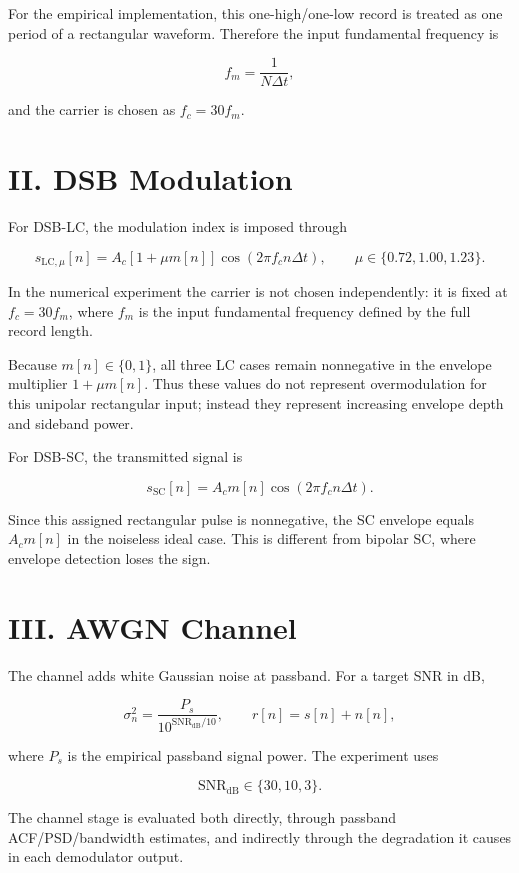 \documentclass[11pt]{article}
\begin{document}
For the empirical implementation, this one-high/one-low record is treated as one period of a rectangular waveform. Therefore the input fundamental frequency is

\[
f_m=\frac{1}{N\Delta t},
\]

and the carrier is chosen as $f_c=30f_m$.

\section{II. DSB Modulation}

For DSB-LC, the modulation index is imposed through

\[
s_{\mathrm{LC},\mu}[n]=A_c\left[1+\mu m[n]\right]\cos(2\pi f_c n\Delta t),
\qquad
\mu\in\{0.72,1.00,1.23\}.
\]

In the numerical experiment the carrier is not chosen independently: it is fixed at $f_c=30f_m$, where $f_m$ is the input fundamental frequency defined by the full record length.

Because $m[n]\in\{0,1\}$, all three LC cases remain nonnegative in the envelope multiplier $1+\mu m[n]$. Thus these values do not represent overmodulation for this unipolar rectangular input; instead they represent increasing envelope depth and sideband power.

For DSB-SC, the transmitted signal is

\[
s_{\mathrm{SC}}[n]=A_c m[n]\cos(2\pi f_c n\Delta t).
\]

Since this assigned rectangular pulse is nonnegative, the SC envelope equals $A_c m[n]$ in the noiseless ideal case. This is different from bipolar SC, where envelope detection loses the sign.

\section{III. AWGN Channel}

The channel adds white Gaussian noise at passband. For a target SNR in dB,

\[
\sigma_n^2=\frac{P_s}{10^{\mathrm{SNR}_{\mathrm{dB}}/10}},
\qquad
r[n]=s[n]+n[n],
\]

where $P_s$ is the empirical passband signal power. The experiment uses

\[
\mathrm{SNR}_{\mathrm{dB}}\in\{30,10,3\}.
\]

The channel stage is evaluated both directly, through passband ACF/PSD/bandwidth estimates, and indirectly through the degradation it causes in each demodulator output.
\end{document}
